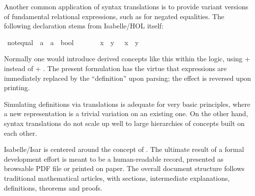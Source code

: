 \begin{isabellebody}
\begin{isamarkuptext}
  \medskip Another common application of syntax translations is to
  provide variant versions of fundamental relational expressions, such
  as \isa{{\isasymnoteq}} for negated equalities.  The following declaration
  stems from Isabelle/HOL itself:%
\end{isamarkuptext}%
\isamarkuptrue%
\ {\isachardoublequote}{\isacharunderscore}not{\isacharunderscore}equal{\isachardoublequote}\ {\isacharcolon}{\isacharcolon}\ {\isachardoublequote}{\isacharprime}a\ {\isasymRightarrow}\ {\isacharprime}a\ {\isasymRightarrow}\ bool{\isachardoublequote}\ \ \ \ {\isacharparenleft}\ {\isachardoublequote}{\isasymnoteq}{\isasymignore}{\isachardoublequote}\ {}{}{\isacharparenright}\isanewline
\isamarkupfalse%
\ {\isachardoublequote}x\ {\isasymnoteq}{\isasymignore}\ y{\isachardoublequote}\ {\isasymrightleftharpoons}\ {\isachardoublequote}{\isasymnot}\ {\isacharparenleft}x\ {\isacharequal}\ y{\isacharparenright}{\isachardoublequote}\isamarkupfalse%
%
\begin{isamarkuptext}%
\noindent Normally one would introduce derived concepts like this
  within the logic, using  + 
  instead of  + .  The
  present formulation has the virtue that expressions are immediately
  replaced by the ``definition'' upon parsing; the effect is reversed
  upon printing.

  Simulating definitions via translations is adequate for very basic
  principles, where a new representation is a trivial variation on an
  existing one.  On the other hand, syntax translations do not scale
  up well to large hierarchies of concepts built on each other.%
\end{isamarkuptext}%
\isamarkuptrue%
%
\isamarkuptrue%
%
\begin{isamarkuptext}%
Isabelle/Isar is centered around the concept of .  The ultimate result of a
  formal development effort is meant to be a human-readable record,
  presented as browsable PDF file or printed on paper.  The overall
  document structure follows traditional mathematical articles, with
  sections, intermediate explanations, definitions, theorems and
  proofs.


\end{isamarkuptext}
\end{isabellebody}
